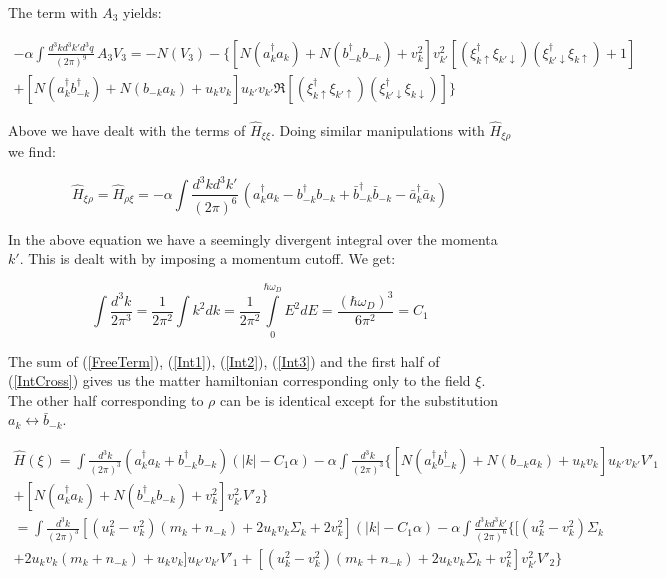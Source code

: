\begin{doublespace}
The term with $A_3$ yields:

\begin{multline}\label{Int3}
    - \alpha  \int \frac{d^3k d^3k' d^3q}{(2\pi)^9}\, A_3 V_3 =
    - N(V_3) - \bigg \{
    \left[N(a^\dag_k a_k) + N(b^\dag_{-k}b_{-k}) + v^2_k \right]v^2_{k'}
    \left[
    \left(\xi^\dag_{k\uparrow}\xi_{k'\downarrow}\right)\left(\xi^\dag_{k'\downarrow}\xi_{k\uparrow}\right) + 1
    \right] \\
    + \left[N(a^\dag_k b^\dag_{-k}) + N(b_{-k}a_k) + u_k v_k \right]u_{k'}v_{k'}
    \Re \left[ \left(\xi^\dag_{k\uparrow}\xi_{k'\uparrow}\right)\left(\xi^\dag_{k'\downarrow}\xi_{k\downarrow}\right)
    \right] \bigg\}
\end{multline}

Above we have dealt with the terms of $\hat H_{\xi\xi}$. Doing similar manipulations with $\hat
H_{\xi\rho}$ we find:

\begin{equation}\label{IntCross}
    \hat H_{\xi\rho} = \hat H_{\rho\xi} = - \alpha  \int \frac{d^3k d^3k'}{(2\pi)^6}\,
    \left( a^\dag_k a_k - b^\dag_{-k} b_{-k} + \bar b^\dag_{-k} \bar b_{-k} - \bar a^\dag_k \bar a_k \right)
\end{equation}

In the above equation we have a seemingly divergent integral over the momenta $k'$. This is dealt
with by imposing a momentum cutoff. We get:

\begin{equation*}
    \int \frac{d^3k}{2\pi^3} = \frac{1}{2\pi^2}\int k^2 dk
    = \frac{1}{2\pi^2}\int\limits_{0}^{\hbar \omega_D} E^2 dE =
    \frac{(\hbar\omega_D)^3}{6\pi^2}=C_1
\end{equation*}

The sum of (\ref{FreeTerm}), (\ref{Int1}), (\ref{Int2}), (\ref{Int3}) and the first half of
(\ref{IntCross}) gives us the matter hamiltonian corresponding only to the field $\xi$. The other
half corresponding to $\rho$ can be is identical except for the substitution $a_k \leftrightarrow
\bar b_{-k}$.

\begin{multline}
    \hat H(\xi) =  \int \frac{d^3k}{(2\pi)^3} \left( a^\dag_k a_k + b^\dag_{-k} b_{-k}\right) \left( |k| - C_1\alpha \right)
        - \alpha  \int \frac{d^3k}{(2\pi)^3}\bigg\{ \left[ N(a^\dag_k b^\dag_{-k}) + N(b_{-k} a_k) + u_k v_k \right] u_{k'} v_{k'} V'_1  \\
        + \left[ N(a^\dag_k a_k) + N(b^\dag_{-k} b_{-k}) + v^2_k \right] v^2_{k'} V'_2 \bigg\} \\
        =  \int \frac{d^3k}{(2\pi)^3} \left[ (u^2_k - v^2_k)(m_k + n_{-k}) + 2 u_k v_k \Sigma_k + 2v^2_k \right](|k|- C_1\alpha)
         - \alpha  \int \frac{d^3k d^3k'}{(2\pi)^6} \bigg\{ \big[(u^2_k - v^2_k)\Sigma_k \\
         + 2 u_k v_k (m_k + n_{-k}) + u_k v_k \big] u_{k'} v_{k'}V'_1
        + \left[ (u^2_k - v^2_k)(m_k + n_{-k}) + 2 u_k v_k \Sigma_k + v^2_k \right] v^2_{k'} V'_2
        \bigg\}
\end{multline}


\end{doublespace}
